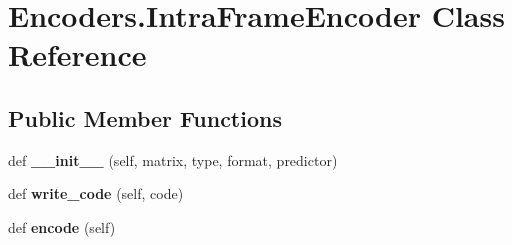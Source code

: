 \hypertarget{classEncoders_1_1IntraFrameEncoder}{}\section{Encoders.\+Intra\+Frame\+Encoder Class Reference}
\label{classEncoders_1_1IntraFrameEncoder}
\subsection*{Public Member Functions}
\begin{DoxyCompactItemize}
\item 
\mbox{\label{classEncoders_1_1IntraFrameEncoder_a73b2b92b4cb36dcd575ffec7337d45ea}} 
def {\bfseries \+\_\+\+\_\+init\+\_\+\+\_\+} (self, matrix, type, format, predictor)
\item 
\mbox{\label{classEncoders_1_1IntraFrameEncoder_aae8a4a0897c0d8df483469d00b1a38f5}} 
def {\bfseries write\+\_\+code} (self, code)
\item 
\mbox{\label{classEncoders_1_1IntraFrameEncoder_a6664a6ca4a71a3ba6857aadffb63846d}} 
def {\bfseries encode} (self)
\end{DoxyCompactItemize}
